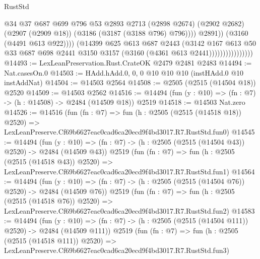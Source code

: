 \begin{lexlean}{RustStd}
\begin{coremodule}
                                        @34
                                        @37
                                        @687
                                        @699
                                        @796
                                        @53
                                        @2893
                                        @2713
                                        (@2898 @2674)
                                        (@2902 @2682)
                                        (@2907 (@2909 @18))
                                        (@3186 (@3187 (@3188 @796) @796))))
                                    @2891))
                                (@3160 (@4491 @613 @922))))
                            (@14399
                              @625
                              @613
                              @687
                              @2443
                              (@3142
                                @167
                                @613
                                @50
                                @33
                                @687
                                @698
                                @2441
                                @3150
                                @3157
                                (@3160 (@4361 @613 @2441))))))))))))))))
@14493 := LexLeanPreservation.Rust.CrateOK @2479 @2481 @2483
@14494 := Nat.casesOn.{0}
@14503 := HAdd.hAdd.{0, 0, 0} @10 @10 @10 (instHAdd.{0} @10 instAddNat)
@14504 := @14503 @2564
@14508 := @2505 (@2515 (@14504 @18)) @2520
@14509 := @14503 @2562
@14516 := @14494 (fun (y : @10) => (fn : @7) -> (h : @14508) -> @2484 (@14509 @18)) @2519
@14518 := @14503 Nat.zero
@14526 := @14516
    (fun (fn : @7) =>
    fun (h : @2505 (@2515 (@14518 @18)) @2520) =>
    LexLeanPreserve.Cf69b6627eac0cad6ca20ecd9f4bd3017.R7.RustStd.fun0)
@14545 := @14494
    (fun (y : @10) => (fn : @7) -> (h : @2505 (@2515 (@14504 @43)) @2520) -> @2484 (@14509 @43))
    @2519
    (fun (fn : @7) =>
    fun (h : @2505 (@2515 (@14518 @43)) @2520) =>
    LexLeanPreserve.Cf69b6627eac0cad6ca20ecd9f4bd3017.R7.RustStd.fun1)
@14564 := @14494
    (fun (y : @10) => (fn : @7) -> (h : @2505 (@2515 (@14504 @76)) @2520) -> @2484 (@14509 @76))
    @2519
    (fun (fn : @7) =>
    fun (h : @2505 (@2515 (@14518 @76)) @2520) =>
    LexLeanPreserve.Cf69b6627eac0cad6ca20ecd9f4bd3017.R7.RustStd.fun2)
@14583 := @14494
    (fun (y : @10) => (fn : @7) -> (h : @2505 (@2515 (@14504 @111)) @2520) -> @2484 (@14509 @111))
    @2519
    (fun (fn : @7) =>
    fun (h : @2505 (@2515 (@14518 @111)) @2520) =>
    LexLeanPreserve.Cf69b6627eac0cad6ca20ecd9f4bd3017.R7.RustStd.fun3)

\end{coremodule}
\end{lexlean}
